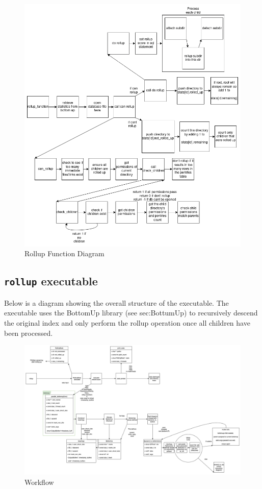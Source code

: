 \begin{figure} [ht]
  \centering
  \includegraphics[width=\textwidth]{images/rollup_function.png}
  \caption{Rollup Function Diagram}
\end{figure}

\subsection{\texttt{rollup} executable}
Below is a diagram showing the overall structure of the \rollup
executable. The \rollup executable uses the BottomUp library (see
sec:BottumUp) to recursively descend the original index and only
perform the rollup operation once all children have been processed.

\begin{figure} [ht]
  \centering \includegraphics[width=\textwidth]{images/rollup.png}
  \caption{\rollup Workflow}
\end{figure}
